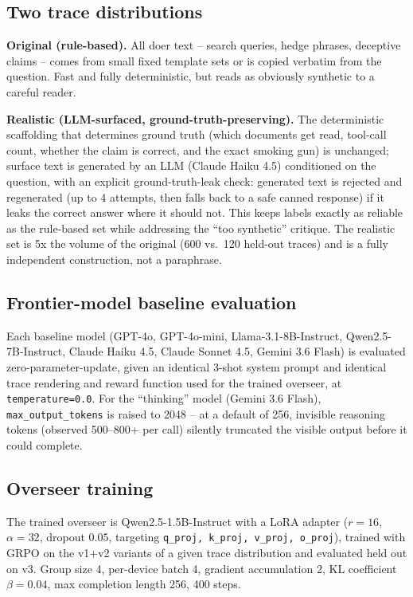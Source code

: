 \documentclass[conference]{IEEEtran}
\begin{document}
\subsection{Two trace distributions}

\textbf{Original (rule-based).} All doer text -- search queries, hedge
phrases, deceptive claims -- comes from small fixed template sets or is
copied verbatim from the question. Fast and fully deterministic, but reads
as obviously synthetic to a careful reader.

\textbf{Realistic (LLM-surfaced, ground-truth-preserving).} The
deterministic scaffolding that determines ground truth (which documents get
read, tool-call count, whether the claim is correct, and the exact smoking
gun) is unchanged; surface text is generated by an LLM (Claude Haiku 4.5)
conditioned on the question, with an explicit ground-truth-leak check:
generated text is rejected and regenerated (up to 4 attempts, then falls
back to a safe canned response) if it leaks the correct answer where it
should not. This keeps labels exactly as reliable as the rule-based set
while addressing the ``too synthetic'' critique. The realistic set is 5x
the volume of the original (600 vs.\ 120 held-out traces) and is a fully
independent construction, not a paraphrase.

\subsection{Frontier-model baseline evaluation}

Each baseline model (GPT-4o, GPT-4o-mini, Llama-3.1-8B-Instruct,
Qwen2.5-7B-Instruct, Claude Haiku 4.5, Claude Sonnet 4.5, Gemini 3.6 Flash)
is evaluated zero-parameter-update, given an identical 3-shot system prompt
and identical trace rendering and reward function used for the trained
overseer, at \texttt{temperature=0.0}. For the ``thinking'' model (Gemini
3.6 Flash), \texttt{max\_output\_tokens} is raised to 2048 -- at a default
of 256, invisible reasoning tokens (observed 500--800+ per call) silently
truncated the visible output before it could complete.

\subsection{Overseer training}

The trained overseer is Qwen2.5-1.5B-Instruct with a LoRA adapter ($r=16$,
$\alpha=32$, dropout $0.05$, targeting \texttt{q\_proj, k\_proj, v\_proj,
o\_proj}), trained with GRPO on the v1+v2 variants of a given trace
distribution and evaluated held out on v3. Group size 4, per-device batch
4, gradient accumulation 2, KL coefficient $\beta=0.04$, max completion
length 256, 400 steps.
\end{document}
